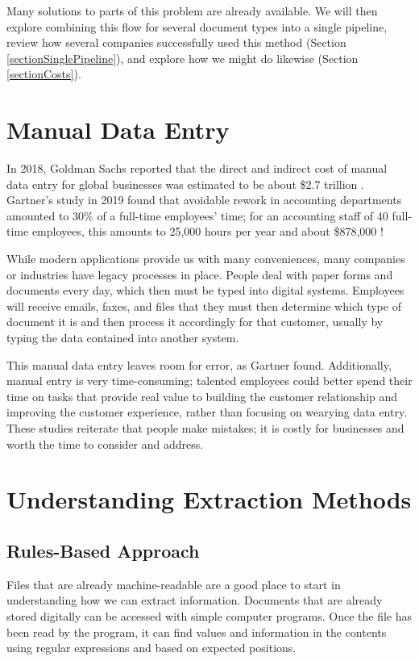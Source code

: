 \documentclass[conference]{IEEEtran}
\begin{document}
Many solutions to parts of this problem are already available. We will then explore combining this flow for several document types into a single pipeline, review how several companies successfully used this method (Section \ref{sectionSinglePipeline}), and explore how we might do likewise (Section \ref{sectionCosts}).

\section{Manual Data Entry} \label{sectionManualDataEntry}
In 2018, Goldman Sachs reported that the direct and indirect cost of manual data entry for global businesses was estimated to be about \$2.7 trillion \cite{schneider2018b2b}. Gartner's study in 2019 found that avoidable rework in accounting departments amounted to 30\% of a full-time employees' time; for an accounting staff of 40 full-time employees, this amounts to 25,000 hours per year and about \$878,000 \cite{lavelle2019gartner}!

While modern applications provide us with many conveniences, many companies or industries have legacy processes in place. People deal with paper forms and documents every day, which then must be typed into digital systems. Employees will receive emails, faxes, and files that they must then determine which type of document it is and then process it accordingly for that customer, usually by typing the data contained into another system.

This manual data entry leaves room for error, as Gartner found. Additionally, manual entry is very time-consuming; talented employees could better spend their time on tasks that provide real value to building the customer relationship and improving the customer experience, rather than focusing on wearying data entry. These studies reiterate that people make mistakes; it is costly for businesses and worth the time to consider and address.

\section{Understanding Extraction Methods} \label{sectionExtractionMethods}

\subsection{Rules-Based Approach}
Files that are already machine-readable are a good place to start in understanding how we can extract information. Documents that are already stored digitally can be accessed with simple computer programs. Once the file has been read by the program, it can find values and information in the contents using regular expressions and based on expected positions.
\end{document}
